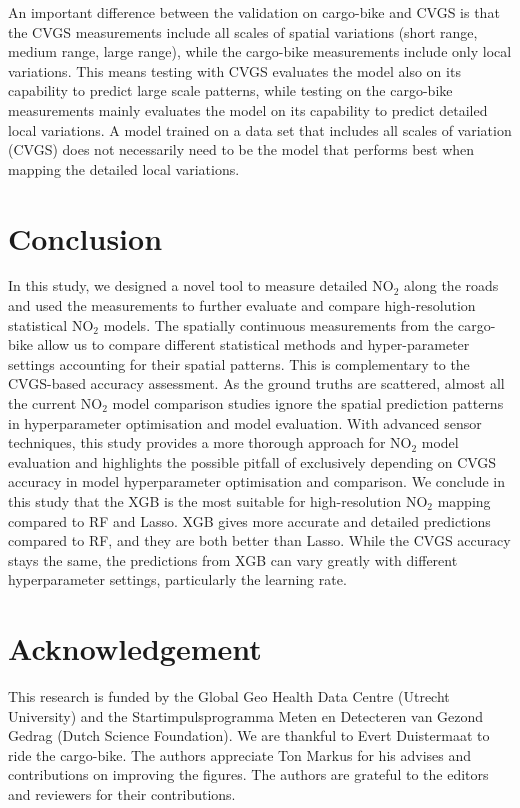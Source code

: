 \documentclass{article}
\begin{document}
An important difference between the validation on cargo-bike and CVGS is that the CVGS measurements include all scales of spatial variations (short range, medium range, large range), while the cargo-bike measurements include only local variations. This means testing with CVGS evaluates the model also on its capability to predict large scale patterns, while testing on the cargo-bike measurements mainly evaluates the model on its capability to predict detailed local variations. A model trained on a data set that includes all scales of variation (CVGS) does not necessarily need to be the model that performs best when mapping the detailed local variations.

\section{Conclusion}
In this study, we designed a novel tool to measure detailed NO$_2$ along the roads and used the measurements to further evaluate and compare high-resolution statistical NO$_2$ models.  The spatially continuous measurements from the cargo-bike allow us to compare different statistical methods and hyper-parameter settings accounting for their spatial patterns. This is complementary to the CVGS-based accuracy assessment. As the ground truths are scattered, almost all the current NO$_2$ model comparison studies ignore the spatial prediction patterns in hyperparameter optimisation and model evaluation. With advanced sensor techniques, this study provides a more thorough approach for NO$_2$ model evaluation and highlights the possible pitfall of exclusively depending on CVGS accuracy in model hyperparameter optimisation and comparison. We conclude in this study that the XGB is the most suitable for high-resolution NO$_2$ mapping compared to RF and Lasso. XGB gives more accurate and detailed predictions compared to RF, and they are both better than Lasso. While the CVGS accuracy stays the same, the predictions from XGB can vary greatly with different hyperparameter settings, particularly the learning rate.    


\section*{Acknowledgement}
This research is funded by the Global Geo Health Data Centre (Utrecht University) and the Startimpulsprogramma Meten en Detecteren van Gezond Gedrag (Dutch Science Foundation). We are thankful to Evert Duistermaat to ride the cargo-bike. The authors appreciate Ton Markus for his advises and contributions on improving the figures. The authors are grateful to the editors and reviewers for their contributions. 

\newpage


\end{document}
